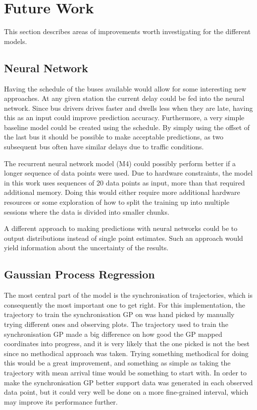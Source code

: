 \section{Future Work}
\label{sec:future-work}
This section describes areas of improvements worth investigating for the different models.

\subsection{Neural Network}
Having the schedule of the buses available would allow for some interesting new approaches. At any given station the current delay could be fed into the neural network. Since bus drivers drives faster and dwells less when they are late, having this as an input could improve prediction accuracy. Furthermore, a very simple baseline model could be created using the schedule. By simply using the offset of the last bus it should be possible to make acceptable predictions, as two subsequent bus often have similar delays due to traffic conditions.

The recurrent neural network model (M4) could possibly perform better if a longer sequence of data points were used. Due to hardware constraints, the model in this work uses sequences of 20 data points as input, more than that required additional memory. Doing this would either require more additional hardware resources or some exploration of how to split the training up into multiple sessions where the data is divided into smaller chunks.

A different approach to making predictions with neural networks could be to output distributions instead of single point estimates. Such an approach would yield information about the uncertainty of the results.

\subsection{Gaussian Process Regression}
The most central part of the model is the synchronisation of trajectories, which is consequently the most important one to get right. For this implementation, the trajectory to train the synchronisation GP on was hand picked by manually trying different ones and observing plots. The trajectory used to train the synchronisation GP made a big difference on how good the GP mapped coordinates into progress, and it is very likely that the one picked is not the best since no methodical approach was taken. Trying something methodical for doing this would be a great improvement, and something as simple as taking the trajectory with mean arrival time would be something to start with. In order to make the synchronisation GP better support data was generated in each observed data point, but it could very well be done on a more fine-grained interval, which may improve its performance further.

